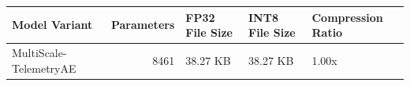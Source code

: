 \begin{tabular}{lrlll}
\toprule
Model Variant & Parameters & FP32 File Size & INT8 File Size & Compression Ratio \\
\midrule
MultiScale-TelemetryAE & 8461 & 38.27 KB & 38.27 KB & 1.00x \\
\bottomrule
\end{tabular}
